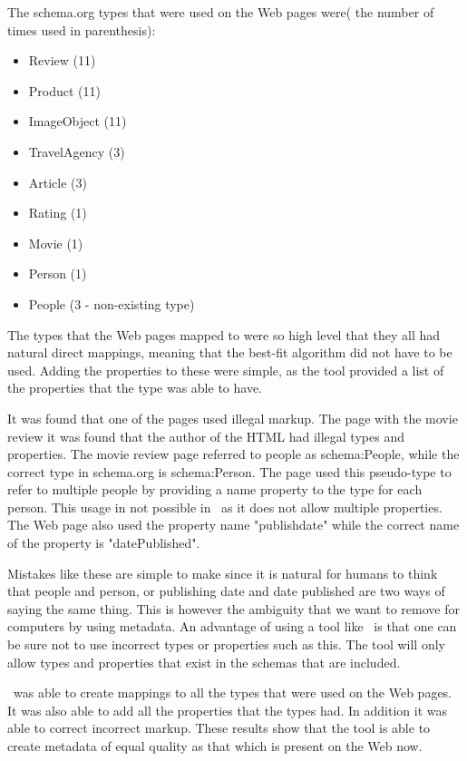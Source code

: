 The schema.org types that were used on the Web pages were( the number of times used in parenthesis):

\begin{itemize}
	\item Review (11)
	\item Product (11)
	\item ImageObject (11)
	\item TravelAgency (3)
	\item Article (3)
	\item Rating (1)
	\item Movie (1)
	\item Person (1)
	\item People (3 - non-existing type)
\end{itemize}

The types that the Web pages mapped to were so high level that they all had natural direct mappings,
meaning that the best-fit algorithm did not have to be used.
Adding the properties to these were simple,
as the tool provided a list of the properties that the type was able to have.

It was found that one of the pages used illegal markup.
The page with the movie review it was found that the author of the HTML had illegal types and properties.
The movie review page referred to people as schema:People, while the correct type in schema.org is schema:Person.
The page used this pseudo-type to refer to multiple people by providing a name property to the type for each person.
This usage in not possible in \theartefact\ as it does not allow multiple properties.
The Web page also used the property name "publishdate" while the correct name of the property is "datePublished".

Mistakes like these are simple to make since it is natural for humans to think that people and person,
or publishing date and date published are two ways of saying the same thing.
This is however the ambiguity that we want to remove for computers by using metadata.
An advantage of using a tool like \theartefact\ is that one can be sure not to use incorrect types or properties such as this.
The tool will only allow types and properties that exist in the schemas that are included.

\Theartefact\ was able to create mappings to all the types that were used on the Web pages.
It was also able to add all the properties that the types had.
In addition it was able to correct incorrect markup.
These results show that the tool is able to create metadata of equal quality as that which is present on the Web now.

